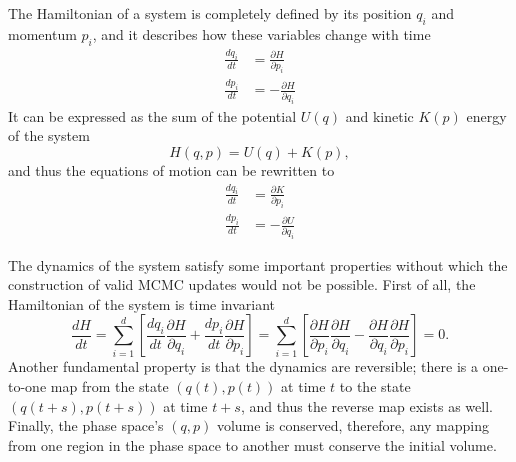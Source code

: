 The Hamiltonian of a system is completely defined by its position $q_i$ and momentum $p_i$, and it describes how these variables change with time 
\begin{align}
	\frac{dq_i}{dt} &= \frac{\partial H}{\partial p_i}\nonumber\\
		\frac{dp_i}{dt} &= -\frac{\partial H}{\partial q_i} \label{eq:motion}
\end{align}
It can be expressed as the sum of the potential $U(q)$ and kinetic $K(p)$ energy of the system
\begin{equation}
	H(q,p) = U(q) + K(p),
\end{equation}
and thus the equations of motion can be rewritten to 
\begin{align}
\frac{dq_i}{dt} &= \frac{\partial K}{\partial p_i}\nonumber\\
\frac{dp_i}{dt} &= -\frac{\partial U}{\partial q_i} \label{eq:motion_kinetic_potential}
\end{align}




The dynamics of the system satisfy some important properties without which the construction of valid MCMC updates would not be possible. First of all, the Hamiltonian of the system is time invariant 
\begin{equation}
	\frac{d H}{d t}=\sum_{i=1}^{d}\left[\frac{d q_{i}}{d t} \frac{\partial H}{\partial q_{i}}+\frac{d p_{i}}{d t} \frac{\partial H}{\partial p_{i}}\right]=\sum_{i=1}^{d}\left[\frac{\partial H}{\partial p_{i}} \frac{\partial H}{\partial q_{i}}-\frac{\partial H}{\partial q_{i}} \frac{\partial H}{\partial p_{i}}\right]=0.
\end{equation}
Another fundamental property is that the dynamics are reversible; there is a one-to-one map from the state $(q(t),p(t))$ at time $t$ to the state $(q(t+s),p(t+s))$ at time $t+s$, and thus the reverse map exists as well.
Finally, the phase space's $(q,p)$ volume is conserved, therefore, any mapping from one region in the phase space to another must conserve the initial volume. 



